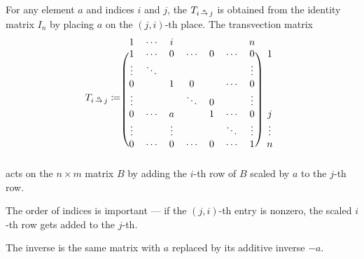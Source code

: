 \begin{definition}
\begin{thmenum}
     For any element \( a \) and indices \( i \) and \( j \), the  \( T_{i \reloset a \to j} \) is obtained from the identity matrix \( I_n \) by placing \( a \) on the \( (j, i) \)-th place. The transvection matrix
    \begin{equation*}
      T_{i \reloset a \to j}
      \coloneqq
      \begin{blockarray}{cccccccc}
        1      & \cdots & i       &        &        &        & n      &        \\
      \begin{block}{(ccccccc)c}
        1      & \cdots & 0       & \cdots & 0      & \cdots & 0      & 1      \\
        \vdots & \ddots &         &        &        &        & \vdots &        \\
        0      &        & 1       & 0      &        & \cdots & 0      &        \\
        \vdots &        &         & \ddots & 0      &        & \vdots &        \\
        0      & \cdots & a       &        & 1      & \cdots & 0      & j      \\
        \vdots &        & \vdots  &        &        & \ddots & \vdots & \vdots \\
        0      & \cdots & 0       & \cdots & 0      & \cdots & 1      & n      \\
      \end{block}
      \end{blockarray}
    \end{equation*}
    acts on the \( n \times m \) matrix \( B \) by adding the \( i \)-th row of \( B \) scaled by \( a \) to the \( j \)-th row.

    The order of indices is important --- if the \( (j, i) \)-th entry is nonzero, the scaled \( i \)-th row gets added to the \( j \)-th.

    The inverse is the same matrix with \( a \) replaced by its additive inverse \( -a \).
  \end{thmenum}
\end{definition}

